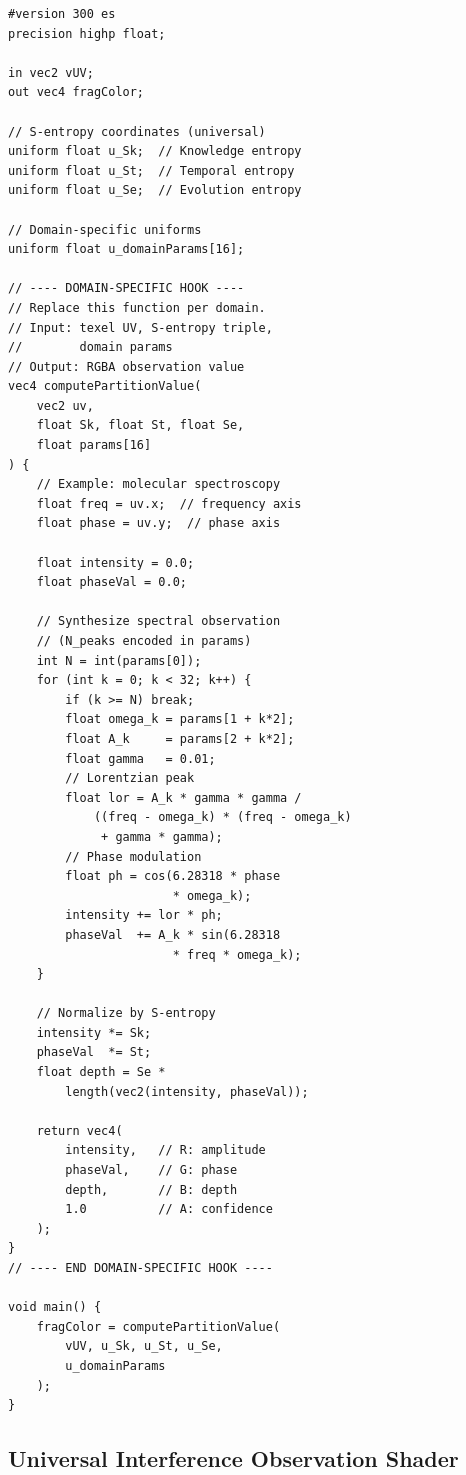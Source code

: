 \documentclass[11pt,twocolumn,a4paper]{article}
\begin{document}
\begin{lstlisting}[style=glsl,caption={Universal Partition Observation Shader}]
#version 300 es
precision highp float;

in vec2 vUV;
out vec4 fragColor;

// S-entropy coordinates (universal)
uniform float u_Sk;  // Knowledge entropy
uniform float u_St;  // Temporal entropy
uniform float u_Se;  // Evolution entropy

// Domain-specific uniforms
uniform float u_domainParams[16];

// ---- DOMAIN-SPECIFIC HOOK ----
// Replace this function per domain.
// Input: texel UV, S-entropy triple,
//        domain params
// Output: RGBA observation value
vec4 computePartitionValue(
    vec2 uv,
    float Sk, float St, float Se,
    float params[16]
) {
    // Example: molecular spectroscopy
    float freq = uv.x;  // frequency axis
    float phase = uv.y;  // phase axis

    float intensity = 0.0;
    float phaseVal = 0.0;

    // Synthesize spectral observation
    // (N_peaks encoded in params)
    int N = int(params[0]);
    for (int k = 0; k < 32; k++) {
        if (k >= N) break;
        float omega_k = params[1 + k*2];
        float A_k     = params[2 + k*2];
        float gamma   = 0.01;
        // Lorentzian peak
        float lor = A_k * gamma * gamma /
            ((freq - omega_k) * (freq - omega_k)
             + gamma * gamma);
        // Phase modulation
        float ph = cos(6.28318 * phase
                       * omega_k);
        intensity += lor * ph;
        phaseVal  += A_k * sin(6.28318
                       * freq * omega_k);
    }

    // Normalize by S-entropy
    intensity *= Sk;
    phaseVal  *= St;
    float depth = Se *
        length(vec2(intensity, phaseVal));

    return vec4(
        intensity,   // R: amplitude
        phaseVal,    // G: phase
        depth,       // B: depth
        1.0          // A: confidence
    );
}
// ---- END DOMAIN-SPECIFIC HOOK ----

void main() {
    fragColor = computePartitionValue(
        vUV, u_Sk, u_St, u_Se,
        u_domainParams
    );
}
\end{lstlisting}

\subsection{Universal Interference Observation Shader}
\end{document}
